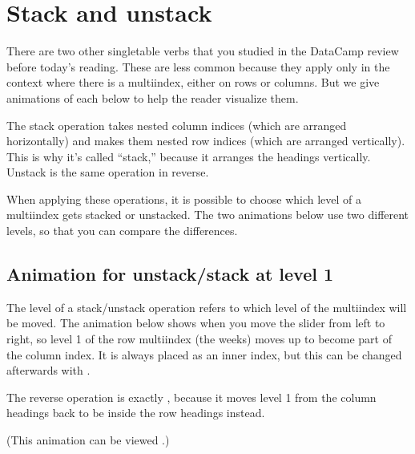 \documentclass[letterpaper,10pt,english]{sphinxmanual}
\begin{document}
\section{Stack and unstack}
\label{\detokenize{chapter-6-single-table-verbs:stack-and-unstack}}
There are two other single\sphinxhyphen{}table verbs that you studied in the DataCamp review before today’s reading.  These are less common because they apply only in the context where there is a multi\sphinxhyphen{}index, either on rows or columns.  But we give animations of each below to help the reader visualize them.

The stack operation takes nested column indices (which are arranged horizontally) and makes them nested row indices (which are arranged vertically).  This is why it’s called “stack,” because it arranges the headings vertically.  Unstack is the same operation in reverse.

When applying these operations, it is possible to choose which level of a multi\sphinxhyphen{}index gets stacked or unstacked.  The two animations below use two different levels, so that you can compare the differences.


\subsection{Animation for unstack/stack at level 1}
\label{\detokenize{chapter-6-single-table-verbs:animation-for-unstack-stack-at-level-1}}
The level of a stack/unstack operation refers to which level of the multi\sphinxhyphen{}index will be moved.  The animation below shows  when you move the slider from left to right, so level 1 of the row multi\sphinxhyphen{}index (the weeks) moves up to become part of the column index.  It is always placed as an inner index, but this can be changed afterwards with .

The reverse operation is exactly , because it moves level 1 from the column headings back to be inside the row headings instead.

(This animation can be viewed .)

\begin{sphinxVerbatim}[commandchars=\\\{\}]
   
 
          
\end{sphinxVerbatim}
\end{document}
